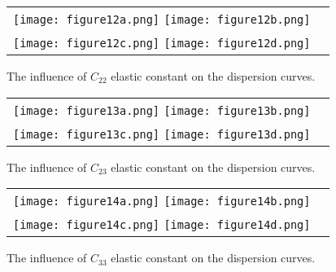 \documentclass[]{spie}  %
\newcommand{\myfigscale}{0.9}
\begin{document}
\begin{figure} [ht]
	\begin{center}
		\begin{tabular}{cc} %
			\texttt{[image: figure12a.png]}
			\texttt{[image: figure12b.png]}\\
			\texttt{[image: figure12c.png]}
			\texttt{[image: figure12d.png]}
		\end{tabular}
	\end{center}
	\caption[] 
	{ \label{fig:C22} 
		The influence of \(C_{22}\) elastic constant on the dispersion curves.}
\end{figure} 

\begin{figure} [ht]
	\begin{center}
		\begin{tabular}{cc} %
			\texttt{[image: figure13a.png]}
			\texttt{[image: figure13b.png]}\\
			\texttt{[image: figure13c.png]}
			\texttt{[image: figure13d.png]}
		\end{tabular}
	\end{center}
	\caption[] 
	{ \label{fig:C23} 
		The influence of \(C_{23}\) elastic constant on the dispersion curves.}
\end{figure} 

\begin{figure} [ht]
	\begin{center}
		\begin{tabular}{cc} %
			\texttt{[image: figure14a.png]}
			\texttt{[image: figure14b.png]}\\
			\texttt{[image: figure14c.png]}
			\texttt{[image: figure14d.png]}
		\end{tabular}
	\end{center}
	\caption[] 
	{ \label{fig:C33} 
		The influence of \(C_{33}\) elastic constant on the dispersion curves.}
\end{figure} 
\end{document}
